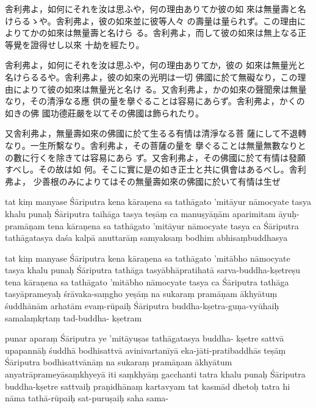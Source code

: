 \newpage

%

舎利弗よ，如何にそれを汝は思ふや，何の理由ありてか彼の如
來は無量壽と名けらるゝや。舎利弗よ，彼の如來並に彼等人々
の壽量は量られず。この理由によりてかの如來は無量壽と名けら
る。舎利弗よ，而して彼の如來は無上なる正等覺を證得せし以來
十劫を經たり。

舎利弗よ，如何にそれを汝は思ふや，何の理由ありてか，彼の
如來は無量光と名けらるるや。舎利弗よ，彼の如來の光明は一切
佛國に於て無礙なり，この理由によりて彼の如來は無量光と名け
る。又舎利弗よ，かの如來の聲聞衆は無量なり，その清淨なる應
供の量を擧ぐることは容易にあらず。舎利弗よ，かくの如きの佛
國功德莊嚴を以てその佛國は飾られたり。

又舎利弗よ，無量壽如來の佛國に於て生るる有情は清淨なる菩
薩にして不退轉なり。一生所繫なり。舎利弗よ，その菩薩の量を
擧ぐることは無量無數なりとの數に行くを除きては容易にあら
ず。又舎利弗よ，その佛國に於て有情は發願すべし。その故は如
何。そこに實に是の如き正士と共に俱會はあるべし。舎利弗よ，
少善根のみによりてはその無量壽如來の佛國に於いて有情は生ぜ

\newpage

tat kiṃ manyase Śāriputra kena kāraṇena sa tathāgato
'mitāyur nāmocyate \da{} tasya khalu punaḥ Śāriputra taihāga\-%
tasya teṣāṃ ca manuṣyāṇām aparimitam āyuḥ-pramāṇam \da{}
tena kāraṇena sa tathāgato 'mitāyur nāmocyate \da{} tasya ca
Śāriputra tathāgatasya daśa kalpā anuttarāṃ samyaksaṃ\-%
bodhim abhisaṃbuddhasya \dd

tat kiṃ manyase Śāriputra kena kāraṇena sa tathāgato
'mitābho nāmocyate \da{} tasya khalu punaḥ Śāriputra tathāga\-%
tasyābhāpratihatā sarva-buddha-kṣetreṣu \da{} tena kāraṇena sa
tathāgato 'mitābho nāmocyate \da{} tasya ca Śāriputra tathāga\-%
tasyāprameyaḥ śrāvaka-saṃgho yeṣāṃ na sukaraṃ pramāṇam
ākhyātuṃ śuddhānām arhatām \da{} evaṃ-rūpaiḥ Śāriputra
buddha-kṣetra-guṇa-vyūhaiḥ samalaṃkṛtaṃ tad-buddha-
kṣetram \dd

punar aparaṃ Śāriputra ye 'mitāyuṣas tathāgatasya buddha-
kṣetre sattvā upapannāḥ śuddhā bodhisattvā avinivartanīyā
eka-jāti-pratibaddhās teṣāṃ Śāriputra bodhisattvānāṃ na
sukaraṃ pramāṇam ākhyātum anyatrāprameyāsaṃkhyeyā
iti saṃkhyāṃ gacchanti \da{} tatra khalu punaḥ Śāriputra
buddha-kṣetre sattvaiḥ praṇidhānaṃ kartavyam \da tat kasmād
dhetoḥ \da{} tatra hi nāma tathā-rūpaiḥ sat-puruṣaiḥ saha sama-

